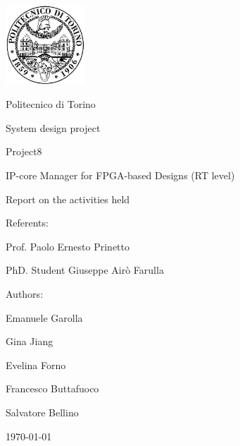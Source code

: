 \documentclass[10pt,  english, makeidx, a4paper, titlepage, oneside]{book}
\begin{document}
\frontmatter
\begin{titlepage}
\vspace{0cm}
\centerline{
\includegraphics[width=3cm]{./logopoli}} 
\vspace{0.5cm}
\centerline{\LARGE Politecnico di Torino}
\vspace{2cm}
\centerline{\Huge\sf System design project}
\vspace{1.5cm}
\centerline{\huge \sf Project8 }
\bigskip
\centerline{\huge\sf IP-core Manager for FPGA-based Designs (RT level)}
\vspace{1.2cm}
\centerline{\huge\sf  Report on the activities held}
\vspace{1.5cm}
\bigskip
\vspace{0.5cm}
%
\centerline{\large Referents: }
\centerline{\large Prof. Paolo Ernesto Prinetto}
\centerline{\large PhD. Student Giuseppe Air\`{o} Farulla}
\bigskip
\vspace{1cm}
%
%
\centerline{\large Authors:}
\bigskip
%
%
\centerline{\large Emanuele Garolla}
\centerline{\large Gina Jiang}
\centerline{\large Evelina Forno}
\centerline{\large Francesco Buttafuoco}
\centerline{\large Salvatore Bellino}
%
\vspace{2cm}
\centerline{\large \monthyeardate\today}
\end{titlepage}
 
\newenvironment{acknowledgements}%
{\cleardoublepage\thispagestyle{empty}\null\vfill\begin{center}%
		\bfseries\textbf{ \huge Acknowledgements}\end{center}}%
{\vfill\null}




\mainmatter
%    
%
%

% 
%
%    
%
%
% 
%
\end{document}
